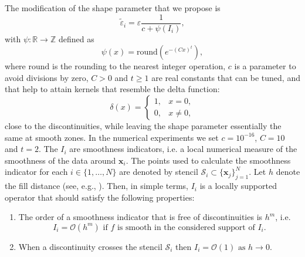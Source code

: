 \documentclass[preprint]{elsarticle}       %
\begin{document}
The modification of the shape parameter that we propose is
\begin{equation}\label{tildegamma}
\tilde\varepsilon_i=\varepsilon\frac{1}{c+\psi(I_i)},
\end{equation}
with $\psi: \mathbb{R}\to \mathbb{Z}$ defined as
\begin{equation}\label{fI}
\psi(x)=\text{round}\left(e^{-(C x)^t}\right),
\end{equation}
where $\text{round}$ is the rounding to the nearest integer operation, $c$ is a parameter to avoid divisions by zero, $C>0$ and $t\ge 1$ are real constants that can be tuned, and that help to attain kernels that resemble the %
delta function:
\begin{equation}\label{deltafunction}
\delta(x) =
\begin{cases}
1, & x = 0, \\
0, & x \neq 0,
\end{cases}
\end{equation}
close to the discontinuities, while leaving the shape parameter essentially the same at smooth zones. In the numerical experiments we set $c=10^{-16}$, $C=10$ and $t=2$. The $I_i$ are smoothness indicators, i.e. a local numerical measure of the smoothness of the data around $\mathbf{x}_i$. The points used to calculate the smoothness indicator for each $i\in\{1,\hdots,N\}$ are denoted by stencil $\mathcal{S}_i\subset \{\mathbf{x}_j\}_{j=1}^N.$
 Let $h$ denote the fill distance (see, e.g., \cite{Fasshauer2007,Wendland}). Then, in simple terms, $I_i$ is a locally supported operator that should satisfy the following properties:

\begin{enumerate}[label={\bfseries P\arabic*}]
\item\label{P1sm1d} The order of a smoothness indicator that is free of discontinuities is $h^m$, i.e.
$$I_{i}=\mathcal{O}(h^m) \,\, \text{if}\,\, f \,\, \text{is smooth in the considered support of $I_i$}.$$%
\item\label{P2sm1d}   When a discontinuity crosses the stencil $\mathcal{S}_{i}$ then
$I_{i} =\mathcal{O}(1) \,\, \text{as}\,\, h\to 0.$

\end{enumerate}
\end{document}
